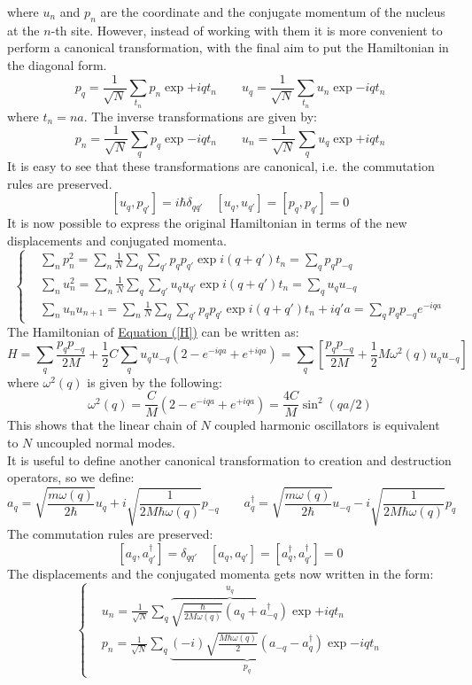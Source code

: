 \documentclass[10.75pt,a4paper,openright,bottom=2cm]{article}
\begin{document}
where $u_n$ and $p_n$ are the coordinate and the conjugate momentum of the nucleus at the $n$-th site. However, instead of working with them it is more convenient to perform a canonical transformation, with the final aim to put the Hamiltonian in the diagonal form.
\[
p_q=\frac{1}{\sqrt{N}}\sum_{t_n}p_n\exp{+iqt_n} \qquad u_q=\frac{1}{\sqrt{N}}\sum_{t_n}u_n\exp{-iqt_n}
\]
where $t_n=na$. The inverse transformations are given by:
\[
p_n=\frac{1}{\sqrt{N}}\sum_qp_q\exp{-iqt_n} \qquad u_n=\frac{1}{\sqrt{N}}\sum_qu_q\exp{+iqt_n}
\]
It is easy to see that these transformations are canonical, i.e. the commutation rules are preserved.
\[
[u_q,p_{q'}]=i\hbar\delta_{qq'} \quad [u_q,u_{q'}]=[p_q,p_{q'}]=0
\]
It is now possible to express the original Hamiltonian in terms of the new displacements and conjugated momenta.
\[
\left\{
\begin{aligned}
&\sum_np_n^2=\sum_n\frac{1}{N}\sum_q\sum_{q'}p_qp_{q'}\exp{i(q+q')t_n}=\sum_qp_qp_{-q}\\
&\sum_nu_n^2=\sum_n\frac{1}{N}\sum_q\sum_{q'}u_qu_{q'}\exp{i(q+q')t_n}=\sum_qu_qu_{-q}\\
&\sum_nu_nu_{n+1}=\sum_n\frac{1}{N}\sum_q\sum_{q'}p_qp_{q'}\exp{i(q+q')t_n+iq'a}=\sum_qp_qp_{-q}e^{-iqa}
\end{aligned}
\right.
\]
The Hamiltonian of \hyperref[H]{Equation (\ref{H})} can be written as:
\begin{equation}
\label{H1}
H=\sum_q\frac{p_qp_{-q}}{2M}+\frac{1}{2}C\sum_qu_qu_{-q}(2-e^{-iqa}+e^{+iqa})=\sum_q\left[\frac{p_qp_{-q}}{2M}+\frac{1}{2}M\omega^2(q)u_qu_{-q}\right]
\end{equation}
where $\omega^2(q)$ is given by the following:
\[
\omega^2(q)=\frac{C}{M}(2-e^{-iqa}+e^{+iqa})=\frac{4C}{M}\sin^2(qa/2)
\]
This shows that the linear chain of $N$ coupled harmonic oscillators is equivalent to $N$ uncoupled normal modes.\\
It is useful to define another canonical transformation to creation and destruction operators, so we define:
\[
a_q=\sqrt{\frac{m\omega(q)}{2\hbar}}u_q+i\sqrt{\frac{1}{2M\hbar\omega(q)}}p_{-q} \qquad a_q^\dagger=\sqrt{\frac{m\omega(q)}{2\hbar}}u_{-q}-i\sqrt{\frac{1}{2M\hbar\omega(q)}}p_q
\]
The commutation rules are preserved:
\[
[a_q,a_{q'}^\dagger]=\delta_{qq'} \quad [a_q,a_{q'}]=[a_q^\dagger,a_{q'}^\dagger]=0
\]
The displacements and the conjugated momenta gets now written in the form:
\[
\left\{
\begin{aligned}
&u_n=\frac{1}{\sqrt{N}}\sum_q\overbrace{\sqrt{\frac{\hbar}{2M\omega(q)}}(a_q+a_{-q}^\dagger)}^{u_q}\exp{+iqt_n}\\
&p_n=\frac{1}{\sqrt{N}}\sum_q\underbrace{(-i)\sqrt{\frac{M\hbar\omega(q)}{2}}(a_{-q}-a_q^\dagger)}_{p_q}\exp{-iqt_n}
\end{aligned}
\right.
\]
\end{document}
